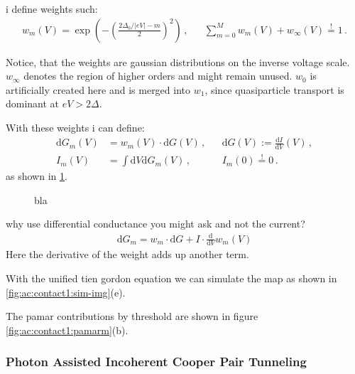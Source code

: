         i define weights such:
        \begin{align}
            w_m(V)=\exp\!\left(-\left(\frac{2\Delta_0/|eV|-m}{2}\right)^2\right)\,,&&
            \sum_{m=0}^M w_m(V) + w_\infty(V)\overset{!}{=}1\,.
        \end{align}

        Notice, that the weights are gaussian distributions on the inverse voltage scale. $w_\infty$ denotes the region of higher orders and might remain unused. $w_0$ is artificially created here and is merged into $w_1$, since quasiparticle transport is dominant at $eV>2\Delta$.

        With these weights i can define:
        \begin{align}
            \mathrm{d}G_m\!(V) &= w_m(V) \cdot \mathrm{d}G\!(V)\,, &&
            \mathrm{d}G\!(V) := \tfrac{\mathrm{d}I}{\mathrm{d}V}\!(V)\,, \\
            I_m\!(V) &= \int \mathrm{d}V \mathrm{d}G_m\!(V)\,, &&
            I_m\!(0) \overset{!}{=} 0 \, .
        \end{align}
        as shown in \ref{fig:ac:pamar-weights}.

        \begin{figure}[t]
            \centering
            \hfill
            \caption{
                bla
            }
            \label{fig:ac:pamar-weights}
        \end{figure}

        why use differential conductance you might ask and not the current?
        \begin{align}
            \mathrm{d}G_m = w_m \cdot \mathrm{d}G + I \cdot \tfrac{\mathrm{d}}{\mathrm{d}V}w_m\!(V)
        \end{align}
        Here the derivative of the weight adds up another term.

        With the unified tien gordon equation we can simulate the map as shown in \ref{fig:ac:contact1:sim-img}(e).

        The pamar contributions by threshold are shown in figure \ref{fig:ac:contact1:pamarm}(b).


    \subsubsection*{Photon Assisted Incoherent Cooper Pair Tunneling}

